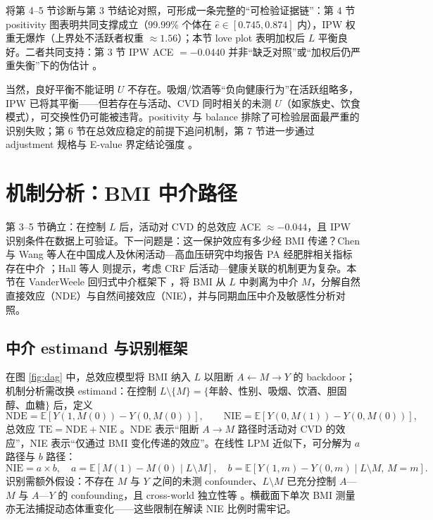 \documentclass[12pt,a4paper]{article}
\newcommand{\E}{\mathbb{E}}
\begin{document}
将第 4–5 节诊断与第 3 节结论对照，可形成一条完整的“可检验证据链”：第 4 节 positivity 图表明共同支撑成立（99.99\% 个体在 $\hat e\in[0.745,0.874]$ 内），IPW 权重无爆炸（上界处不活跃者权重 $\approx 1.56$）；本节 love plot 表明加权后 $L$ 平衡良好。二者共同支持：第 3 节 IPW ACE $=-0.0440$ 并非“缺乏对照”或“加权后仍严重失衡”下的伪估计 \cite{hernan2024whatif,chen2024iptw}。

当然，良好平衡不能证明 $U$ 不存在。吸烟/饮酒等“负向健康行为”在活跃组略多，IPW 已将其平衡——但若存在与活动、CVD 同时相关的未测 $U$（如家族史、饮食模式），可交换性仍可能被违背。positivity 与 balance 排除了可检验层面最严重的识别失败；第 6 节在总效应稳定的前提下追问机制，第 7 节进一步通过 adjustment 规格与 E-value 界定结论强度 \cite{vanderweele2017evalue}。

\section{机制分析：BMI 中介路径}

第 3–5 节确立：在控制 $L$ 后，活动对 CVD 的总效应 ACE $\approx -0.044$，且 IPW 识别条件在数据上可验证。下一问题是：这一保护效应有多少经 BMI 传递？Chen 与 Wang 等人在中国成人及休闲活动—高血压研究中均报告 PA 经肥胖相关指标存在中介 \cite{chen2023pa,wang2023obesity}；Hall 等人 \cite{bjsports2023crf} 则提示，考虑 CRF 后活动—健康关联的机制更为复杂。本节在 VanderWeele 回归式中介框架下 \cite{vanderweele2015explanation}，将 BMI 从 $L$ 中剥离为中介 $M$，分解自然直接效应（NDE）与自然间接效应（NIE），并与同期血压中介及敏感性分析对照。

\subsection{中介 estimand 与识别框架}

在图 \ref{fig:dag} 中，总效应模型将 BMI 纳入 $L$ 以阻断 $A\leftarrow M\to Y$ 的 backdoor；机制分析需改换 estimand：在控制 $L\setminus\{M\}=\{$年龄、性别、吸烟、饮酒、胆固醇、血糖$\}$ 后，定义
\[
\mathrm{NDE}=\E[Y(1,M(0))-Y(0,M(0))],\qquad
\mathrm{NIE}=\E[Y(0,M(1))-Y(0,M(0))],
\]
总效应 $\mathrm{TE}=\mathrm{NDE}+\mathrm{NIE}$ \cite{vanderweele2015explanation}。NDE 表示“阻断 $A\to M$ 路径时活动对 CVD 的效应”，NIE 表示“仅通过 BMI 变化传递的效应”。在线性 LPM 近似下，可分解为 $a$ 路径与 $b$ 路径：
\[
\mathrm{NIE}=a\times b,\quad
a=\E[M(1)-M(0)\mid L\setminus M],\quad
b=\E[Y(1,m)-Y(0,m)\mid L\setminus M,\,M=m].
\]
识别需额外假设：不存在 $M$ 与 $Y$ 之间的未测 confounder、$L\setminus M$ 已充分控制 $A$—$M$ 与 $A$—$Y$ 的 confounding，且 cross-world 独立性等 \cite{vanderweele2015explanation}。横截面下单次 BMI 测量亦无法捕捉动态体重变化——这些限制在解读 NIE 比例时需牢记。
\end{document}
